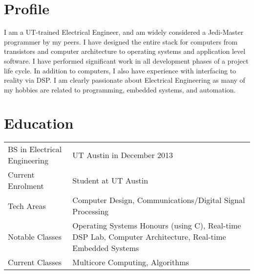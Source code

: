 \documentclass[letterpaper,12pt]{resume}
\begin{document}
\let\olditemize\itemize
\renewcommand{\itemize}{
  \olditemize
  \setlength{\itemsep}{1pt}
  \setlength{\parskip}{0pt}
  \setlength{\parsep}{0pt}
}

\author{James Brisson}
\maketitle

\section{Profile}
\noindent
I am a UT-trained Electrical Engineer, and am widely considered a Jedi-Master programmer by my peers.
I have designed the entire stack for computers from transistors and computer architecture to operating systems and application level software. 
I have performed significant work in all development phases of a project life cycle.
In addition to computers, I also have experience with interfacing to reality via DSP.
I am clearly passionate about Electrical Engineering as many of my hobbies are related to programming, embedded systems, and automation.

\section{Education}
\noindent
\begin{tabular}{p{}p{}}
  BS in Electrical Engineering&
  UT Austin in December 2013\\
  \noalign{\smallskip}
  Current Enrolment&
  Student at UT Austin\\
  \noalign{\smallskip}
  Tech Areas&
  Computer Design, Communications/Digital Signal Processing\\
  \noalign{\smallskip}
  Notable Classes&
  Operating Systems Honours (using C), Real-time DSP Lab, Computer Architecture, Real-time Embedded Systems\\
  \noalign{\smallskip}
  Current Classes&
  Multicore Computing, Algorithms\\
\end{tabular}
\end{document}
